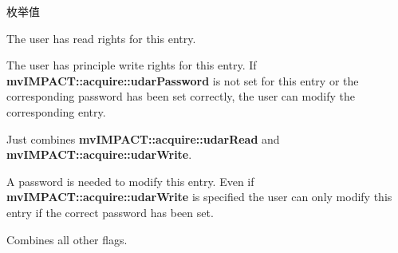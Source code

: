 \begin{Desc}
\item[枚举值]\par
\begin{description}
\item[{\em 
\hypertarget{group___common_interface_ggabda8d2f2e8458c2edb94503478dbcbfaacf4aefb8701b06effbdbc6d2276b1656}{udar\+Read}\label{group___common_interface_ggabda8d2f2e8458c2edb94503478dbcbfaacf4aefb8701b06effbdbc6d2276b1656}
}]The user has read rights for this entry. \item[{\em 
\hypertarget{group___common_interface_ggabda8d2f2e8458c2edb94503478dbcbfaaf5009ebdf0e03b283ca02aab23584503}{udar\+Write}\label{group___common_interface_ggabda8d2f2e8458c2edb94503478dbcbfaaf5009ebdf0e03b283ca02aab23584503}
}]The user has principle write rights for this entry. If {\bfseries mv\+I\+M\+P\+A\+C\+T\+::acquire\+::udar\+Password} is not set for this entry or the corresponding password has been set correctly, the user can modify the corresponding entry. \item[{\em 
\hypertarget{group___common_interface_ggabda8d2f2e8458c2edb94503478dbcbfaa5107eb686d7e6eedbc182a198bc42a67}{udar\+R\+W}\label{group___common_interface_ggabda8d2f2e8458c2edb94503478dbcbfaa5107eb686d7e6eedbc182a198bc42a67}
}]Just combines {\bfseries mv\+I\+M\+P\+A\+C\+T\+::acquire\+::udar\+Read} and {\bfseries mv\+I\+M\+P\+A\+C\+T\+::acquire\+::udar\+Write}. \item[{\em 
\hypertarget{group___common_interface_ggabda8d2f2e8458c2edb94503478dbcbfaa1ff8f508718b73d798f939406987950a}{udar\+Password}\label{group___common_interface_ggabda8d2f2e8458c2edb94503478dbcbfaa1ff8f508718b73d798f939406987950a}
}]A password is needed to modify this entry. Even if {\bfseries mv\+I\+M\+P\+A\+C\+T\+::acquire\+::udar\+Write} is specified the user can only modify this entry if the correct password has been set. \item[{\em 
\hypertarget{group___common_interface_ggabda8d2f2e8458c2edb94503478dbcbfaa13b3f798e862fdaf891cdedf1080a4d3}{udar\+Full}\label{group___common_interface_ggabda8d2f2e8458c2edb94503478dbcbfaa13b3f798e862fdaf891cdedf1080a4d3}
}]Combines all other flags. \end{description}
\end{Desc}

